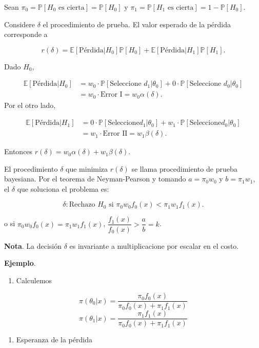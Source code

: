 \documentclass[
  12pt,
]{book}
\providecommand{\tightlist}{%
  \setlength{\itemsep}{0pt}\setlength{\parskip}{0pt}}
\begin{document}
Sean \(\pi_0 = \mathbb P[H_0 \text{ es cierta}] = \mathbb P[H_0]\) y \(\pi_1 = \mathbb P[H_1 \text{ es cierta}] = 1 -\mathbb P[H_0]\).

Considere \(\delta\) el procedimiento de prueba. El valor esperado de la pérdida corresponde a

\[ r(\delta)  = \mathbb E[\text{Pérdida}|H_0] \mathbb P[H_0] + \mathbb E[\text{Pérdida}|H_1]\mathbb P[H_1].\]

Dado \(H_0\),

\begin{align*}
\mathbb E[\text{Pérdida}|H_0] & = w_0\cdot \mathbb P[\text{Seleccione } d_1|\theta_0] + 0\cdot \mathbb P[\text{Seleccione } d_0|\theta_0]\\
& = w_0 \cdot \text{Error I} = w_0\alpha(\delta).
\end{align*}
Por el otro lado,

\begin{align*}
\mathbb E[\text{Pérdida}|H_1] & = 0\cdot \mathbb P[\text{Seleccione} d_1|\theta_0] + w_1\cdot \mathbb P[\text{Seleccione} d_0|\theta_0]\\
& = w_1 \cdot \text{Error II} = w_1\beta(\delta).
\end{align*}

Entonces \(r(\delta) = w_0\alpha(\delta) + w_1\beta(\delta)\).

El procedimiento \(\delta\) que minimiza \(r(\delta)\) se llama procedimiento de prueba bayesiana. Por el teorema de Neyman-Pearson y tomando \(a=\pi_0w_0\) y \(b=\pi_1w_1\), el \(\delta\) que soluciona el problema es:

\[\delta: \text{Rechazo }H_0 \text{ si } \pi_0w_0f_0(x) < \pi_1w_1f_1(x). \]

o si \(\pi_0w_0f_0(x) = \pi_1w_1f_1(x)\), \(\dfrac{f_1(x)}{f_0(x)} > \dfrac ab = k\).

\textbf{Nota}. La decisión \(\delta\) es invariante a multiplicacione por escalar en el costo.

\textbf{Ejemplo}.

\begin{enumerate}
\def\labelenumi{\alph{enumi}.}
\tightlist
\item
  Calculemos
\end{enumerate}

\[\pi(\theta_0|x) = \dfrac{\pi_0f_0(x)}{\pi_0f_0(x)+\pi_1f_1(x)}\]
\[\pi(\theta_1|x) = \dfrac{\pi_1f_1(x)}{\pi_0f_0(x)+\pi_1f_1(x)}\]

\begin{enumerate}
\def\labelenumi{\alph{enumi}.}
\setcounter{enumi}{1}
\tightlist
\item
  Esperanza de la pérdida
\end{enumerate}
\end{document}
